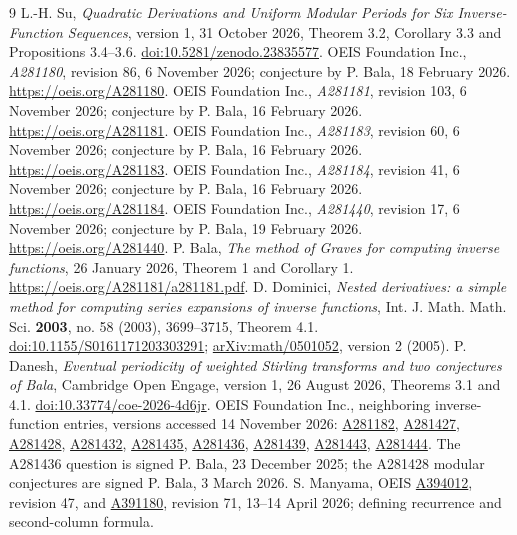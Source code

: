 \documentclass[11pt]{article}
\begin{document}
\begin{thebibliography}{9}\small
{} L.-H. Su, \emph{Quadratic Derivations and Uniform Modular
Periods for Six Inverse-Function Sequences}, version 1, 31 October
2026, Theorem 3.2, Corollary 3.3 and Propositions 3.4--3.6.
\href{https://doi.org/10.5281/zenodo.23835577}{doi:10.5281/zenodo.23835577}.
 OEIS Foundation Inc., \emph{A281180}, revision 86,
6 November 2026; conjecture by P. Bala, 18 February 2026.
\url{https://oeis.org/A281180}.
 OEIS Foundation Inc., \emph{A281181}, revision 103,
6 November 2026; conjecture by P. Bala, 16 February 2026.
\url{https://oeis.org/A281181}.
 OEIS Foundation Inc., \emph{A281183}, revision 60,
6 November 2026; conjecture by P. Bala, 16 February 2026.
\url{https://oeis.org/A281183}.
 OEIS Foundation Inc., \emph{A281184}, revision 41,
6 November 2026; conjecture by P. Bala, 16 February 2026.
\url{https://oeis.org/A281184}.
 OEIS Foundation Inc., \emph{A281440}, revision 17,
6 November 2026; conjecture by P. Bala, 19 February 2026.
\url{https://oeis.org/A281440}.
 P. Bala, \emph{The method of Graves for computing
inverse functions}, 26 January 2026, Theorem 1 and Corollary 1.
\url{https://oeis.org/A281181/a281181.pdf}.
 D. Dominici, \emph{Nested derivatives: a simple method
for computing series expansions of inverse functions}, Int. J. Math.
Math. Sci. \textbf{2003}, no. 58 (2003), 3699--3715, Theorem 4.1.
\href{https://doi.org/10.1155/S0161171203303291}{doi:10.1155/S0161171203303291};
\href{https://arxiv.org/abs/math/0501052}{arXiv:math/0501052}, version 2 (2005).
 P. Danesh, \emph{Eventual periodicity of weighted
Stirling transforms and two conjectures of Bala}, Cambridge Open Engage,
version 1, 26 August 2026, Theorems 3.1 and 4.1.
\href{https://doi.org/10.33774/coe-2026-4d6jr}{doi:10.33774/coe-2026-4d6jr}.
 OEIS Foundation Inc., neighboring inverse-function entries,
versions accessed 14 November 2026:
\href{https://oeis.org/A281182}{A281182},
\href{https://oeis.org/A281427}{A281427},
\href{https://oeis.org/A281428}{A281428},
\href{https://oeis.org/A281432}{A281432},
\href{https://oeis.org/A281435}{A281435},
\href{https://oeis.org/A281436}{A281436},
\href{https://oeis.org/A281439}{A281439},
\href{https://oeis.org/A281443}{A281443},
\href{https://oeis.org/A281444}{A281444}.
The A281436 question is signed P. Bala, 23 December 2025;
the A281428 modular conjectures are signed P. Bala, 3 March 2026.
 S. Manyama, OEIS
\href{https://oeis.org/A394012}{A394012}, revision 47,
and \href{https://oeis.org/A391180}{A391180}, revision 71,
13--14 April 2026; defining recurrence and second-column formula.
\end{thebibliography}
\end{document}
